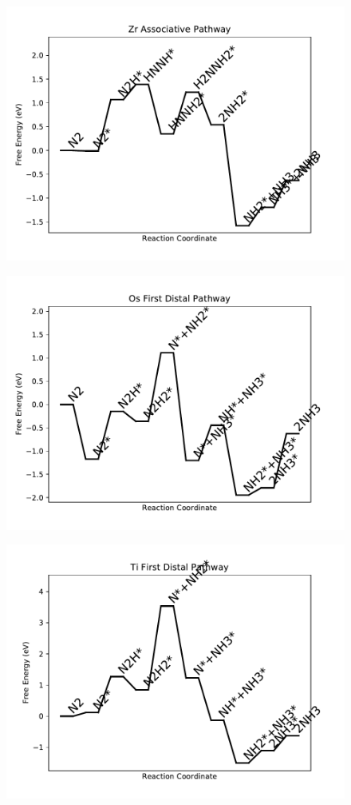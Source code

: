 \begin{figure}
\includegraphics[width=0.8\linewidth]{data/plots/Zr_associative.pdf}
\end{figure}

\begin{figure}
\includegraphics[width=0.8\linewidth]{data/plots/Os_distal_1.pdf}
\end{figure}

\begin{figure}
\includegraphics[width=0.8\linewidth]{data/plots/Ti_distal_1.pdf}
\end{figure}

